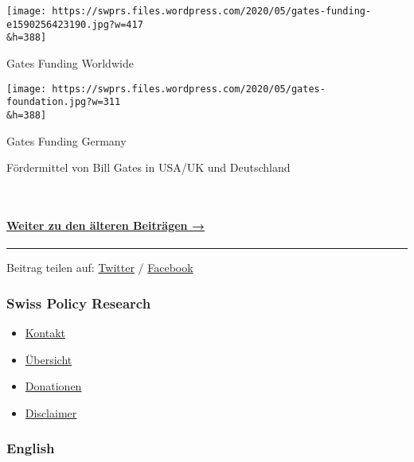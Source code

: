 \href{https://swprs.files.wordpress.com/2020/05/gates-funding-e1590256423190.jpg}{}

\texttt{[image: https://swprs.files.wordpress.com/2020/05/gates-funding-e1590256423190.jpg?w=417\\\&h=388]}

Gates Funding Worldwide

\href{https://swprs.files.wordpress.com/2020/05/gates-foundation.jpg}{}

\texttt{[image: https://swprs.files.wordpress.com/2020/05/gates-foundation.jpg?w=311\\\&h=388]}

Gates Funding Germany

Fördermittel von Bill Gates in USA/UK und Deutschland

~

\hypertarget{weiter-zu-den-uxe4lteren-beitruxe4gen-}{%
\paragraph{\texorpdfstring{\href{https://swprs.org/fakten-zu-covid-19-archiv-maerz-2020/}{Weiter
zu den älteren Beiträgen
→}}{Weiter zu den älteren Beiträgen →}}\label{weiter-zu-den-uxe4lteren-beitruxe4gen-}}

\begin{center}\rule{0.5\linewidth}{\linethickness}\end{center}

Beitrag teilen auf:
\href{https://twitter.com/intent/tweet?url=https://swprs.org/covid-19-hinweis-ii/}{Twitter}
/
\href{https://www.facebook.com/share.php?u=https://swprs.org/covid-19-hinweis-ii/}{Facebook}

\hypertarget{swiss-policy-research}{%
\subsubsection{Swiss Policy Research}\label{swiss-policy-research}}

\begin{itemize}
\tightlist
\item
  \href{https://swprs.org/kontakt/}{Kontakt}
\item
  \href{https://swprs.org/uebersicht/}{Übersicht}
\item
  \href{https://swprs.org/donationen/}{Donationen}
\item
  \href{https://swprs.org/disclaimer/}{Disclaimer}
\end{itemize}

\hypertarget{english}{%
\subsubsection{English}\label{english}}

